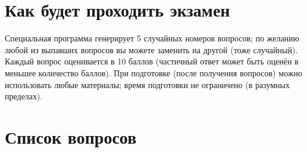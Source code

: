 \documentclass{article}
\begin{document}
\section{Как будет проходить экзамен}

Специальная программа генерирует 5 случайных номеров вопросов; по желанию любой из выпавших вопросов вы можете заменить на другой (тоже случайный). Каждый вопрос оценивается в 10 баллов (частичный ответ может быть оценён в меньшее количество баллов). При подготовке (после получения вопросов) можно использовать любые материалы; время подготовки не ограничено (в разумных пределах).

\section{Список вопросов}
\end{document}
